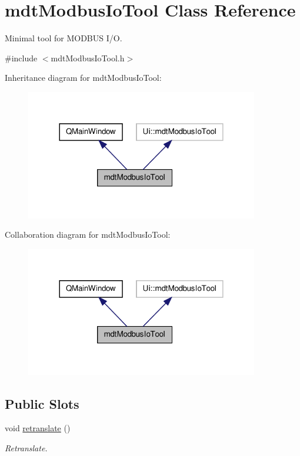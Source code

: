 \hypertarget{classmdt_modbus_io_tool}{\section{mdt\-Modbus\-Io\-Tool Class Reference}
\label{classmdt_modbus_io_tool}
}


Minimal tool for M\-O\-D\-B\-U\-S I/\-O.  




{\ttfamily \#include $<$mdt\-Modbus\-Io\-Tool.\-h$>$}



Inheritance diagram for mdt\-Modbus\-Io\-Tool\-:
\nopagebreak
\begin{figure}[H]
\begin{center}
\leavevmode
\includegraphics[width=288pt]{classmdt_modbus_io_tool__inherit__graph}
\end{center}
\end{figure}


Collaboration diagram for mdt\-Modbus\-Io\-Tool\-:
\nopagebreak
\begin{figure}[H]
\begin{center}
\leavevmode
\includegraphics[width=288pt]{classmdt_modbus_io_tool__coll__graph}
\end{center}
\end{figure}
\subsection*{Public Slots}
\begin{DoxyCompactItemize}
\item 
void \hyperlink{classmdt_modbus_io_tool_a5e0ccfb8e352242fffc3f65f442f4d2f}{retranslate} ()
\begin{DoxyCompactList}\small\item\em Retranslate. \end{DoxyCompactList}\end{DoxyCompactItemize}
